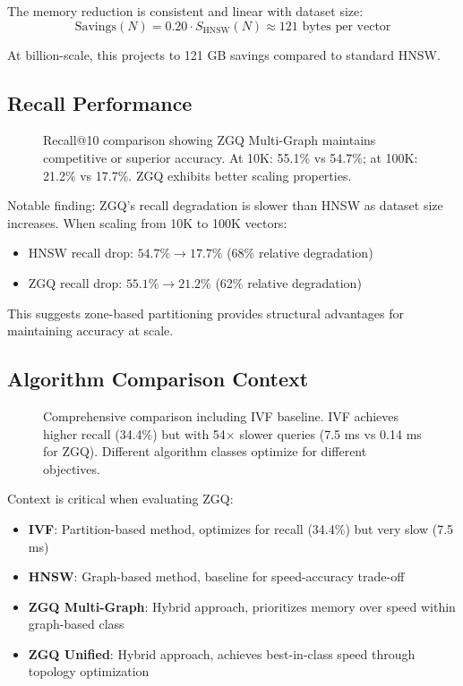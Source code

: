 \documentclass[11pt,a4paper]{article}
\begin{document}
The memory reduction is consistent and linear with dataset size:
$$\text{Savings}(N) = 0.20 \cdot S_{\text{HNSW}}(N) \approx 121 \text{ bytes per vector}$$

At billion-scale, this projects to 121 GB savings compared to standard HNSW.

\subsection{Recall Performance}

\begin{figure}[h]
\centering
{}
\caption{Recall@10 comparison showing ZGQ Multi-Graph maintains competitive or superior accuracy. At 10K: 55.1\% vs 54.7\%; at 100K: 21.2\% vs 17.7\%. ZGQ exhibits better scaling properties.}
\label{fig:recall_comparison}
\end{figure}

Notable finding: ZGQ's recall degradation is slower than HNSW as dataset size increases. When scaling from 10K to 100K vectors:
\begin{itemize}
    \item HNSW recall drop: $54.7\% \to 17.7\%$ (68\% relative degradation)
    \item ZGQ recall drop: $55.1\% \to 21.2\%$ (62\% relative degradation)
\end{itemize}

This suggests zone-based partitioning provides structural advantages for maintaining accuracy at scale.

\subsection{Algorithm Comparison Context}

\begin{figure}[h]
\centering
{}
\caption{Comprehensive comparison including IVF baseline. IVF achieves higher recall (34.4\%) but with 54× slower queries (7.5 ms vs 0.14 ms for ZGQ). Different algorithm classes optimize for different objectives.}
\label{fig:algorithm_comparison}
\end{figure}

Context is critical when evaluating ZGQ:
\begin{itemize}
    \item \textbf{IVF}: Partition-based method, optimizes for recall (34.4\%) but very slow (7.5 ms)
    \item \textbf{HNSW}: Graph-based method, baseline for speed-accuracy trade-off
    \item \textbf{ZGQ Multi-Graph}: Hybrid approach, prioritizes memory over speed within graph-based class
    \item \textbf{ZGQ Unified}: Hybrid approach, achieves best-in-class speed through topology optimization
\end{itemize}
\end{document}
